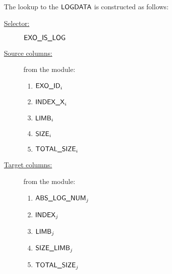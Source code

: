 The lookup to the $\textsf{LOGDATA}$ is constructed as follows:
\begin{description}
	\item[\underline{Selector:}] $\textsf{EXO\_IS\_LOG}$
	\item[\underline{Source columns:}] from the \mmioMod{} module:
		\begin{multicols}{3}
			\begin{enumerate}
				\item $\textsf{EXO\_ID}_{i}$
				\item $\textsf{INDEX\_X}_{i}$
				\item $\textsf{LIMB}_{i}$
				\item $\textsf{SIZE}_{i}$
				\item $\textsf{TOTAL\_SIZE}_{i}$
			\end{enumerate}
		\end{multicols}
	\item[\underline{Target columns:}] from the \logDataMod{} module: 
		\begin{multicols}{3}
			\begin{enumerate}
				\item $\textsf{ABS\_LOG\_NUM}_{j}$
				\item $\textsf{INDEX}_{j}$
				\item $\textsf{LIMB}_{j}$
				\item $\textsf{SIZE\_LIMB}_{j}$
				\item $\textsf{TOTAL\_SIZE}_{j}$
			\end{enumerate}
		\end{multicols}
\end{description}